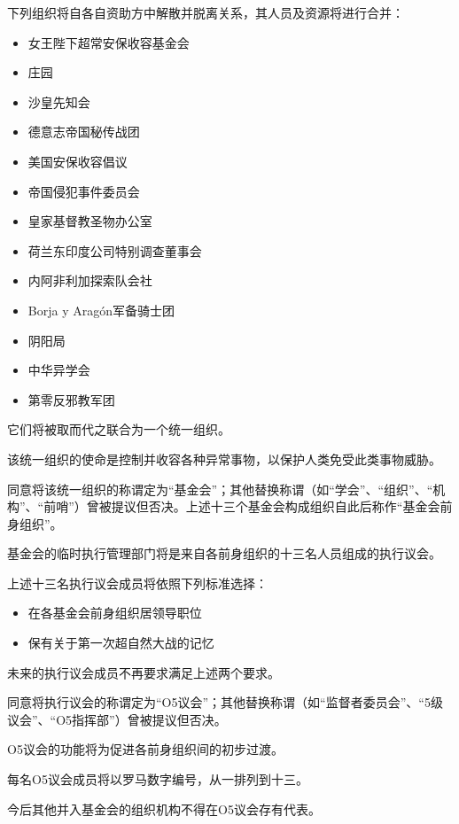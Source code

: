 \begin{whiteboxbb}

下列组织将自各自资助方中解散并脱离关系，其人员及资源将进行合并：

\begin{itemize}
\item 女王陛下超常安保收容基金会
\item {}庄园
\item 沙皇先知会
\item 德意志帝国秘传战团
\item 美国安保收容倡议
\item 帝国侵犯事件委员会
\item 皇家基督教圣物办公室
\item 荷兰东印度公司特别调查董事会
\item 内阿非利加探索队会社
\item Borja y Aragón军备骑士团
\item 阴阳局
\item 中华异学会
\item 第零反邪教军团
\end{itemize}

它们将被取而代之联合为一个统一组织。

该统一组织的使命是控制并收容各种异常事物，以保护人类免受此类事物威胁。

同意将该统一组织的称谓定为“基金会”；其他替换称谓（如“学会”、“组织”、“机构”、“前哨”）曾被提议但否决。上述十三个基金会构成组织自此后称作“基金会前身组织”。

\end{whiteboxbb}


\begin{whiteboxbb}

基金会的临时执行管理部门将是来自各前身组织的十三名人员组成的执行议会。

上述十三名执行议会成员将依照下列标准选择：

\begin{itemize}

\item 在各基金会前身组织居领导职位
\item 保有关于第一次超自然大战的记忆

\end{itemize}

未来的执行议会成员不再要求满足上述两个要求。

同意将执行议会的称谓定为“O5议会”；其他替换称谓（如“监督者委员会”、“5级议会”、“O5指挥部”）曾被提议但否决。

O5议会的功能将为促进各前身组织间的初步过渡。

每名O5议会成员将以罗马数字编号，从一排列到十三。

今后其他并入基金会的组织机构不得在O5议会存有代表。

\end{whiteboxbb}

